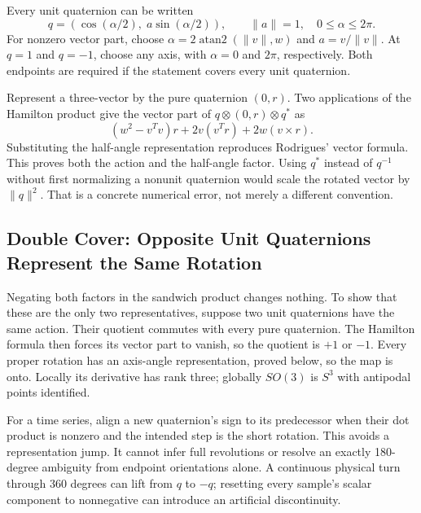 Every unit quaternion can be written
\begin{equation}
 q=(\cos(\alpha/2),\;a\sin(\alpha/2)),\qquad \|a\|=1,\quad 0\le\alpha\le 2\pi.
 \label{eq:quaternion_rotation}
\end{equation}
For nonzero vector part, choose $\alpha=2\operatorname{atan2}(\|v\|,w)$ and $a=v/\|v\|$. At $q=1$ and $q=-1$, choose any axis, with $\alpha=0$ and $2\pi$, respectively. Both endpoints are required if the statement covers every unit quaternion.

Represent a three-vector by the pure quaternion $(0,r)$. Two applications of the Hamilton product give the vector part of $q\otimes(0,r)\otimes q^*$ as
\begin{equation}
 (w^2-v^Tv)r+2v(v^Tr)+2w(v\times r).
 \label{eq:quaternion_sandwich_expansion}
\end{equation}
Substituting the half-angle representation reproduces Rodrigues' vector formula. This proves both the action and the half-angle factor. Using $q^*$ instead of $q^{-1}$ without first normalizing a nonunit quaternion would scale the rotated vector by $\|q\|^2$. That is a concrete numerical error, not merely a different convention.

\subsection{Double Cover: Opposite Unit Quaternions Represent the Same Rotation}
\label{thm:quaternion_double_cover}

Negating both factors in the sandwich product changes nothing. To show that these are the only two representatives, suppose two unit quaternions have the same action. Their quotient commutes with every pure quaternion. The Hamilton formula then forces its vector part to vanish, so the quotient is $+1$ or $-1$. Every proper rotation has an axis-angle representation, proved below, so the map is onto. Locally its derivative has rank three; globally $SO(3)$ is $S^3$ with antipodal points identified.

For a time series, align a new quaternion's sign to its predecessor when their dot product is nonzero and the intended step is the short rotation. This avoids a representation jump. It cannot infer full revolutions or resolve an exactly 180-degree ambiguity from endpoint orientations alone. A continuous physical turn through 360 degrees can lift from $q$ to $-q$; resetting every sample's scalar component to nonnegative can introduce an artificial discontinuity.

